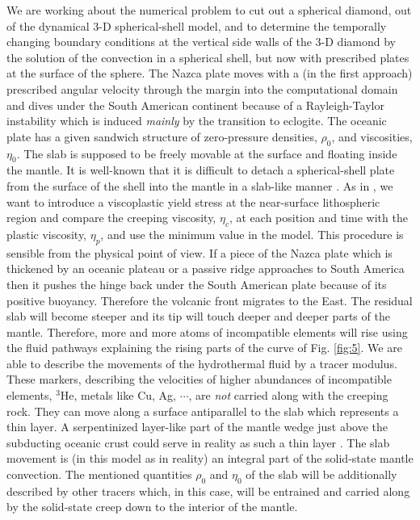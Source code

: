 \documentclass[twoside,10pt]{article}
\begin{document}
We are working about the numerical problem to cut out a spherical diamond, out of the dynamical 3-D spherical-shell model, and to determine the temporally changing boundary conditions at the vertical side walls of the 3-D diamond by the solution of the convection in a spherical shell, but now with prescribed plates at the surface of the sphere.
The Nazca plate moves with a (in the first approach) prescribed angular velocity through the margin into the computational domain and dives under the South American continent because of a Rayleigh-Taylor instability which is induced \emph{mainly} by the transition to eclogite. 
The oceanic plate has a given sandwich structure of zero-pressure densities, $\rho_0$, \cite{Ganguly2009} and viscosities, $\eta_0$.
The slab is supposed to be freely movable at the surface and floating inside the mantle. 
It is well-known that it is difficult to detach a spherical-shell plate from the surface of the shell into the mantle in a slab-like manner \cite{Becker2009}. 
As in \cite{Walzer2008a}, we want to introduce a viscoplastic yield stress at the near-surface lithospheric region and compare the creeping viscosity, $\eta_c$, at each position and time with the plastic viscosity, $\eta_p$, and use the minimum value in the model.
This procedure is sensible from the physical point of view. 
If a piece of the Nazca plate which is thickened by an oceanic plateau or a passive ridge approaches to South America then it pushes the hinge back under the South American plate because of its positive buoyancy. 
Therefore the volcanic front migrates to the East. 
The residual slab will become steeper and its tip will touch deeper and deeper parts of the mantle.
Therefore, more and more atoms of incompatible elements will rise using the fluid pathways explaining the rising parts of the curve of Fig. \ref{fig:5}.
We are able to describe the movements of the hydrothermal fluid by a tracer modulus. These markers, describing the velocities of higher abundances of incompatible elements, $^{3}$He, metals like Cu, Ag, $\cdots$, are \emph{not} carried along with the creeping rock.
They can move along a surface antiparallel to the slab which represents a thin layer. 
A serpentinized layer-like part of the mantle wedge just above the subducting oceanic crust could serve in reality as such a thin layer \cite{Guillot2009}.
The slab movement is (in this model as in reality) an integral part of the solid-state mantle convection.
The mentioned quantities $\rho_0$ and $\eta_0$ of the slab will be additionally described by other tracers which, in this case, will be entrained and carried along by the solid-state creep down to the interior of the mantle.
\end{document}
